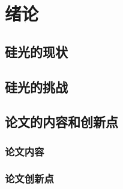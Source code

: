 \chapter{绪论}

\section{硅光的现状}

\section{硅光的挑战}

\section{论文的内容和创新点}

\subsection{论文内容}
\subsection{论文创新点}


